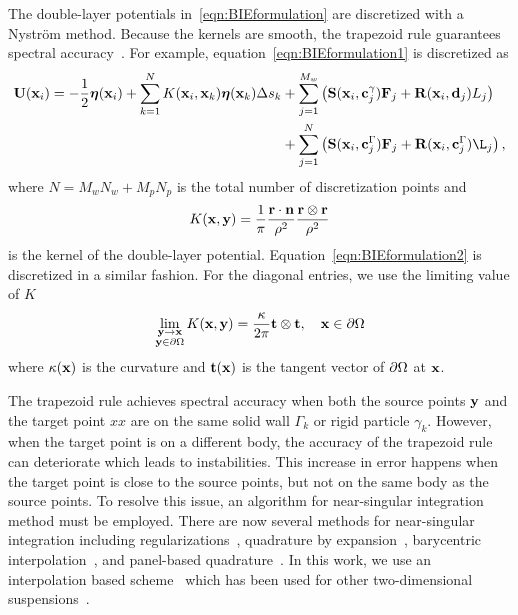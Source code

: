 \documentclass[preprint, 10pt]{elsarticle}
\begin{document}
The double-layer potentials in~\eqref{eqn:BIEformulation} are
discretized with a Nystr\"om method.  Because the kernels are smooth,
the trapezoid rule guarantees spectral accuracy~\cite{tre-wei2014}.  For
example, equation~\eqref{eqn:BIEformulation1} is discretized as
\begin{equation*}
  \begin{aligned}
  \UU(\xx_i) = -\frac{1}{2}\eeta(\xx_i) + 
  \sum_{k=1}^{N} K(\xx_i,\xx_k) \eeta(\xx_k) \Delta s_k
    &+ \sum_{j=1}^{M_w} \left(\mathbf{S}(\xx_i,\cc^\gamma_j)\FF_j +
    \mathbf{R}(\xx_i,\dd_j)L_j\right)  \\
    &+ \sum_{j=1}^{N} \left(\mathbf{S}(\xx_i,\cc^\Gamma_j)\FF_j +
    \mathbf{R}(\xx_i,\cc^\Gamma_j)\L_j\right),
  \end{aligned}
\end{equation*}
where $N = M_w N_w + M_p N_p$ is the total number of discretization
points and
\begin{align*}
  K({\mathbf{x}},{\mathbf{y}}) = \frac{1}{\pi} \frac{{\mathbf{r}} \cdot {\mathbf{n}}}{\rho^2} 
               \frac{{\mathbf{r}} \otimes {\mathbf{r}}}{\rho^2}
\end{align*}
is the kernel of the double-layer potential.
Equation~\eqref{eqn:BIEformulation2} is discretized in a similar
fashion.  For the diagonal entries, we use the limiting value of $K$
\begin{align*}
  \lim_{\substack{{\mathbf{y}} \rightarrow {\mathbf{x}} \\ {\mathbf{y}} \in {\partial}\Omega}} 
    K({\mathbf{x}},{\mathbf{y}}) = \frac{\kappa}{2\pi}{\mathbf{t}}\otimes{\mathbf{t}},
    \quad {\mathbf{x}} \in {\partial}\Omega
\end{align*}
where $\kappa({\mathbf{x}})$ is the curvature and ${\mathbf{t}}({\mathbf{x}})$ is the tangent
vector of ${\partial}\Omega$ at ${\mathbf{x}}$.

The trapezoid rule achieves spectral accuracy when both the source
points ${\mathbf{y}}$ and the target point $xx$ are on the same solid wall
$\Gamma_k$ or rigid particle $\gamma_k$.  However, when the target point
is on a different body, the accuracy of the trapezoid rule can
deteriorate which leads to instabilities.  This increase in error
happens when the target point is close to the source points, but not on
the same body as the source points.  To resolve this issue, an algorithm
for near-singular integration method must be employed.  There are now
several methods for near-singular integration including
regularizations~\cite{bea-yin-wil2016, bea-lai2001}, quadrature by
expansion~\cite{Klockner2013}, barycentric
interpolation~\cite{bar-wu-vee2015}, and panel-based
quadrature~\cite{hel-oja2008}.  In this work, we use an interpolation
based scheme~\cite{Ying2006} which has been used for other
two-dimensional suspensions~\cite{Quaife2014}.
\end{document}
